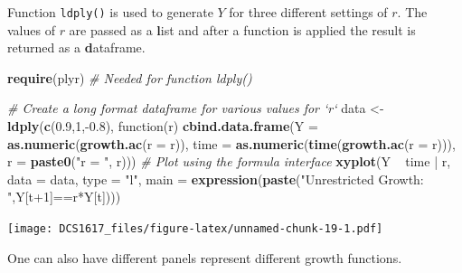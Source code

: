 \documentclass[]{book}
\newenvironment{Shaded}{\begin{snugshade}}{\end{snugshade}}
\newcommand{\KeywordTok}[1]{\textcolor[rgb]{0.13,0.29,0.53}{\textbf{{#1}}}}
\newcommand{\DataTypeTok}[1]{\textcolor[rgb]{0.13,0.29,0.53}{{#1}}}
\newcommand{\DecValTok}[1]{\textcolor[rgb]{0.00,0.00,0.81}{{#1}}}
\newcommand{\FloatTok}[1]{\textcolor[rgb]{0.00,0.00,0.81}{{#1}}}
\newcommand{\StringTok}[1]{\textcolor[rgb]{0.31,0.60,0.02}{{#1}}}
\newcommand{\CommentTok}[1]{\textcolor[rgb]{0.56,0.35,0.01}{\textit{{#1}}}}
\newcommand{\NormalTok}[1]{{#1}}
\begin{document}
Function \texttt{ldply()} is used to generate \(Y\) for three different
settings of \(r\). The values of \(r\) are passed as a \textbf{l}ist and
after a function is applied the result is returned as a
\textbf{d}ataframe.

\begin{Shaded}
\begin{Highlighting}[]
\KeywordTok{require}\NormalTok{(plyr)          }\CommentTok{# Needed for function ldply()}

\CommentTok{# Create a long format dataframe for various values for `r`}
\NormalTok{data <-}\StringTok{ }\KeywordTok{ldply}\NormalTok{(}\KeywordTok{c}\NormalTok{(}\FloatTok{0.9}\NormalTok{,}\DecValTok{1}\NormalTok{,-}\FloatTok{0.8}\NormalTok{), function(r) }\KeywordTok{cbind.data.frame}\NormalTok{(}\DataTypeTok{Y    =} \KeywordTok{as.numeric}\NormalTok{(}\KeywordTok{growth.ac}\NormalTok{(}\DataTypeTok{r =} \NormalTok{r)),}
                                                          \DataTypeTok{time =} \KeywordTok{as.numeric}\NormalTok{(}\KeywordTok{time}\NormalTok{(}\KeywordTok{growth.ac}\NormalTok{(}\DataTypeTok{r =} \NormalTok{r))),}
                                                          \DataTypeTok{r    =} \KeywordTok{paste0}\NormalTok{(}\StringTok{"r = "}\NormalTok{, r)))}
\CommentTok{# Plot using the formula interface}
\KeywordTok{xyplot}\NormalTok{(Y ~}\StringTok{ }\NormalTok{time |}\StringTok{ }\NormalTok{r, }\DataTypeTok{data =} \NormalTok{data, }\DataTypeTok{type =} \StringTok{"l"}\NormalTok{, }\DataTypeTok{main =} \KeywordTok{expression}\NormalTok{(}\KeywordTok{paste}\NormalTok{(}\StringTok{"Unrestricted Growth: "}\NormalTok{,Y[t}\DecValTok{+1}\NormalTok{]==r*Y[t])))}
\end{Highlighting}
\end{Shaded}

\texttt{[image: DCS1617\_files/figure-latex/unnamed-chunk-19-1.pdf]}

One can also have different panels represent different growth functions.
\end{document}
